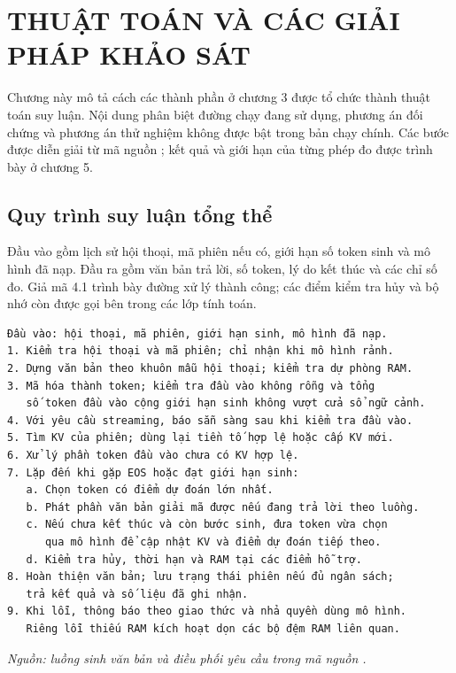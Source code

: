 \chapter{THUẬT TOÁN VÀ CÁC GIẢI PHÁP KHẢO SÁT}


Chương này mô tả cách các thành phần ở chương 3 được tổ chức thành thuật toán suy luận. Nội dung phân biệt đường chạy đang sử dụng, phương án đối chứng và phương án thử nghiệm không được bật trong bản chạy chính. Các bước được diễn giải từ mã nguồn \cite{moe_tierengine_arch}; kết quả và giới hạn của từng phép đo được trình bày ở chương 5.

\section{Quy trình suy luận tổng thể}

Đầu vào gồm lịch sử hội thoại, mã phiên nếu có, giới hạn số token sinh và mô hình đã nạp. Đầu ra gồm văn bản trả lời, số token, lý do kết thúc và các chỉ số đo. Giả mã 4.1 trình bày đường xử lý thành công; các điểm kiểm tra hủy và bộ nhớ còn được gọi bên trong các lớp tính toán.

\begin{Verbatim}[samepage=true,breaklines=true,breakanywhere=true,fontsize=\small,frame=single,framesep=3mm]
Đầu vào: hội thoại, mã phiên, giới hạn sinh, mô hình đã nạp.
1. Kiểm tra hội thoại và mã phiên; chỉ nhận khi mô hình rảnh.
2. Dựng văn bản theo khuôn mẫu hội thoại; kiểm tra dự phòng RAM.
3. Mã hóa thành token; kiểm tra đầu vào không rỗng và tổng
   số token đầu vào cộng giới hạn sinh không vượt cửa sổ ngữ cảnh.
4. Với yêu cầu streaming, báo sẵn sàng sau khi kiểm tra đầu vào.
5. Tìm KV của phiên; dùng lại tiền tố hợp lệ hoặc cấp KV mới.
6. Xử lý phần token đầu vào chưa có KV hợp lệ.
7. Lặp đến khi gặp EOS hoặc đạt giới hạn sinh:
   a. Chọn token có điểm dự đoán lớn nhất.
   b. Phát phần văn bản giải mã được nếu đang trả lời theo luồng.
   c. Nếu chưa kết thúc và còn bước sinh, đưa token vừa chọn
      qua mô hình để cập nhật KV và điểm dự đoán tiếp theo.
   d. Kiểm tra hủy, thời hạn và RAM tại các điểm hỗ trợ.
8. Hoàn thiện văn bản; lưu trạng thái phiên nếu đủ ngân sách;
   trả kết quả và số liệu đã ghi nhận.
9. Khi lỗi, thông báo theo giao thức và nhả quyền dùng mô hình.
   Riêng lỗi thiếu RAM kích hoạt dọn các bộ đệm RAM liên quan.
\end{Verbatim}

\textit{Nguồn: luồng sinh văn bản và điều phối yêu cầu trong mã nguồn \cite{moe_tierengine_arch}.}

